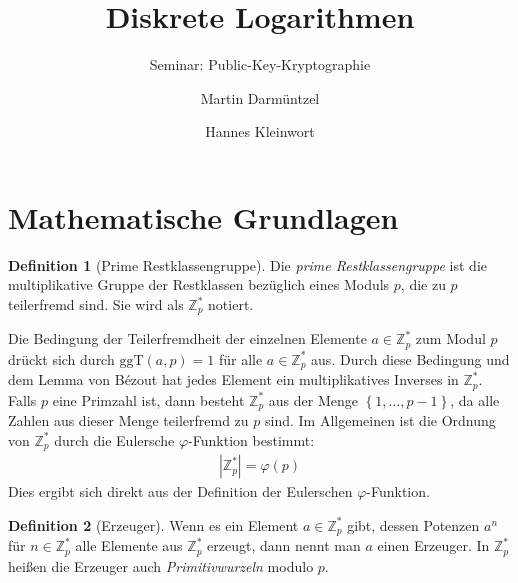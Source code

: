 \documentclass[
  a4paper,
  11pt,
]{scrartcl}
\title{Diskrete Logarithmen}
\subtitle{Seminar: Public-Key-Kryptographie}
\author{%
  Martin Darmüntzel \and Hannes Kleinwort
}
\theoremstyle{plain}
\theoremstyle{definition}
\newtheorem{definition}{Definition}
\theoremstyle{remark}
\newcommand{\Z}{\mathbb{Z}}
\newcommand{\ggT}{\text{ggT}}
\begin{document}
\maketitle

\section{Mathematische Grundlagen}
\label{sec:mathematische_grundlagen}

\begin{definition}[Prime Restklassengruppe]
  Die \emph{prime Restklassengruppe} ist die multiplikative Gruppe der
  Restklassen bezüglich eines Moduls $p$, die zu $p$ teilerfremd sind. Sie wird
  als $\Z_p^*$ notiert.
\end{definition}

Die Bedingung der Teilerfremdheit der einzelnen Elemente $a \in \Z_p^*$ zum
Modul $p$ drückt sich durch $\ggT(a, p) = 1$ für alle $a \in \Z_p^*$ aus. Durch
diese Bedingung und dem Lemma von Bézout hat jedes Element ein multiplikatives
Inverses in $\Z_p^*$. Falls $p$ eine Primzahl ist, dann besteht $\Z_p^*$ aus
der Menge $\left\{1, \ldots, p-1\right\}$, da alle Zahlen aus dieser Menge
teilerfremd zu $p$ sind. Im Allgemeinen ist die Ordnung von $\Z_p^*$ durch die
Eulersche $\varphi$-Funktion bestimmt:
\begin{align*}
  \left| \Z_p^* \right| = \varphi(p)
\end{align*}
Dies ergibt sich direkt aus der Definition der Eulerschen $\varphi$-Funktion.

\begin{definition}[Erzeuger]\label{def:erzeuger}
  Wenn es ein Element $a \in \Z_p^*$ gibt, dessen Potenzen $a^n$ für
  $n \in \Z_p^*$ alle Elemente aus $\Z_p^*$ erzeugt, dann nennt man $a$ einen
  Erzeuger. In $\Z_p^*$ heißen die Erzeuger auch \emph{Primitivwurzeln} modulo
  $p$.
\end{definition}
\end{document}
